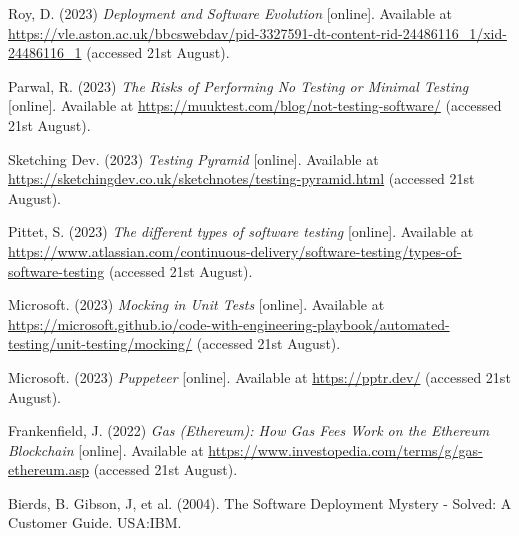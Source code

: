  \noindent [TODO1] Roy, D. (2023) \textit{Deployment and Software Evolution} [online]. Available at \url{https://vle.aston.ac.uk/bbcswebdav/pid-3327591-dt-content-rid-24486116_1/xid-24486116_1} (accessed 21st August).
 \vspace{0.2cm}

 \noindent [TODO2] Parwal, R. (2023) \textit{The Risks of Performing No Testing or Minimal Testing} [online]. Available at \url{https://muuktest.com/blog/not-testing-software/} (accessed 21st August).
 \vspace{0.2cm}

 \noindent [TODO3] Sketching Dev. (2023) \textit{Testing Pyramid} [online]. Available at \url{https://sketchingdev.co.uk/sketchnotes/testing-pyramid.html} (accessed 21st August).
 \vspace{0.2cm}

 \noindent [TODO4] Pittet, S. (2023) \textit{The different types of software testing} [online]. Available at \url{https://www.atlassian.com/continuous-delivery/software-testing/types-of-software-testing} (accessed 21st August).
 \vspace{0.2cm}

 \noindent [TODO5] Microsoft. (2023) \textit{Mocking in Unit Tests} [online]. Available at \url{https://microsoft.github.io/code-with-engineering-playbook/automated-testing/unit-testing/mocking/} (accessed 21st August).
 \vspace{0.2cm}

 \noindent [TODO6] Microsoft. (2023) \textit{Puppeteer} [online]. Available at \url{https://pptr.dev/} (accessed 21st August).
 \vspace{0.2cm}

 \noindent [TODO7] Frankenfield, J. (2022) \textit{Gas (Ethereum): How Gas Fees Work on the Ethereum Blockchain} [online]. Available at \url{https://www.investopedia.com/terms/g/gas-ethereum.asp} (accessed 21st August).
 \vspace{0.2cm}

 \noindent [TODO8] Bierds, B. Gibson, J, et al. (2004). The Software Deployment Mystery - Solved: A Customer Guide. USA:IBM.
 \vspace{0.2cm}

\newpage
